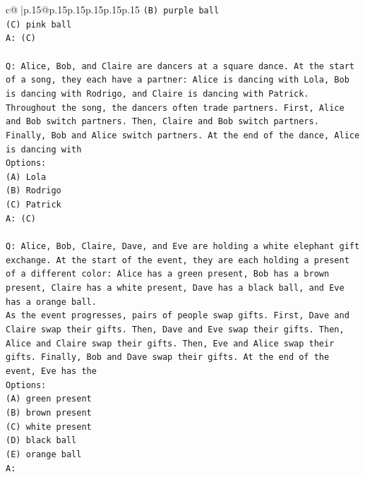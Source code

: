 \documentclass{article}
\begin{document}
{\begin{supertabular}{c@{$\;$}|p{.15\linewidth}@{}p{.15\linewidth}p{.15\linewidth}p{.15\linewidth}p{.15\linewidth}p{.15\linewidth}}
{{{\texttt{(B) purple ball} \\
\texttt{(C) pink ball} \\
\texttt{A: (C)} \\
\\ 
\texttt{Q: Alice, Bob, and Claire are dancers at a square dance. At the start of a song, they each have a partner: Alice is dancing with Lola, Bob is dancing with Rodrigo, and Claire is dancing with Patrick.} \\
\texttt{Throughout the song, the dancers often trade partners. First, Alice and Bob switch partners. Then, Claire and Bob switch partners. Finally, Bob and Alice switch partners. At the end of the dance, Alice is dancing with} \\
\texttt{Options:} \\
\texttt{(A) Lola} \\
\texttt{(B) Rodrigo} \\
\texttt{(C) Patrick} \\
\texttt{A: (C)} \\
\\ 
\texttt{Q: Alice, Bob, Claire, Dave, and Eve are holding a white elephant gift exchange. At the start of the event, they are each holding a present of a different color: Alice has a green present, Bob has a brown present, Claire has a white present, Dave has a black ball, and Eve has a orange ball.} \\
\texttt{As the event progresses, pairs of people swap gifts. First, Dave and Claire swap their gifts. Then, Dave and Eve swap their gifts. Then, Alice and Claire swap their gifts. Then, Eve and Alice swap their gifts. Finally, Bob and Dave swap their gifts. At the end of the event, Eve has the} \\
\texttt{Options:} \\
\texttt{(A) green present} \\
\texttt{(B) brown present} \\
\texttt{(C) white present} \\
\texttt{(D) black ball} \\
\texttt{(E) orange ball} \\
\texttt{A:} \\
            }
        }
    }
     \\ \\


\end{supertabular}}
\end{document}
